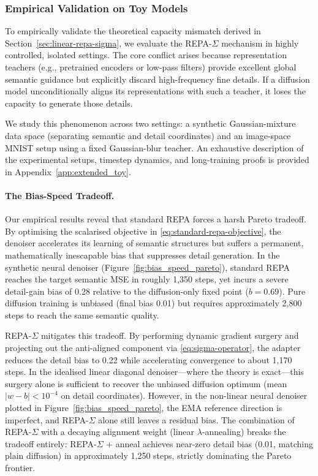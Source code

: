 \subsubsection{Empirical Validation on Toy Models}
\label{sec:repa_sigma_experiments}

To empirically validate the theoretical capacity mismatch derived in Section~\ref{sec:linear-repa-sigma}, we evaluate the REPA-\texorpdfstring{$\Sigma$}{Sigma} mechanism in highly controlled, isolated settings. The core conflict arises because representation teachers (e.g., pretrained encoders or low-pass filters) provide excellent global semantic guidance but explicitly discard high-frequency fine details. If a diffusion model unconditionally aligns its representations with such a teacher, it loses the capacity to generate those details.

We study this phenomenon across two settings: a synthetic Gaussian-mixture data space (separating semantic and detail coordinates) and an image-space MNIST setup using a fixed Gaussian-blur teacher. An exhaustive description of the experimental setups, timestep dynamics, and long-training proofs is provided in Appendix~\ref{app:extended_toy}.

\paragraph{The Bias-Speed Tradeoff.}
Our empirical results reveal that standard REPA forces a harsh Pareto tradeoff. By optimising the scalarised objective in \eqref{eq:standard-repa-objective}, the denoiser accelerates its learning of semantic structures but suffers a permanent, mathematically inescapable bias that suppresses detail generation. In the synthetic neural denoiser (Figure~\ref{fig:bias_speed_pareto}), standard REPA reaches the target semantic MSE in roughly 1,350 steps, yet incurs a severe detail-gain bias of 0.28 relative to the diffusion-only fixed point ($b=0.69$). Pure diffusion training is unbiased (final bias 0.01) but requires approximately 2,800 steps to reach the same semantic quality.

REPA-\texorpdfstring{$\Sigma$}{Sigma} mitigates this tradeoff. By performing dynamic gradient surgery and projecting out the anti-aligned component via \eqref{eq:sigma-operator}, the adapter reduces the detail bias to 0.22 while accelerating convergence to about 1,170 steps. In the idealised linear diagonal denoiser---where the theory is exact---this surgery alone is sufficient to recover the unbiased diffusion optimum (mean $|w-b|<10^{-4}$ on detail coordinates). However, in the non-linear neural denoiser plotted in Figure~\ref{fig:bias_speed_pareto}, the EMA reference direction is imperfect, and REPA-\texorpdfstring{$\Sigma$}{Sigma} alone still leaves a residual bias. The combination of REPA-\texorpdfstring{$\Sigma$}{Sigma} with a decaying alignment weight (linear $\lambda$-annealing) breaks the tradeoff entirely: REPA-\texorpdfstring{$\Sigma$}{Sigma} + anneal achieves near-zero detail bias (0.01, matching plain diffusion) in approximately 1,250 steps, strictly dominating the Pareto frontier.

